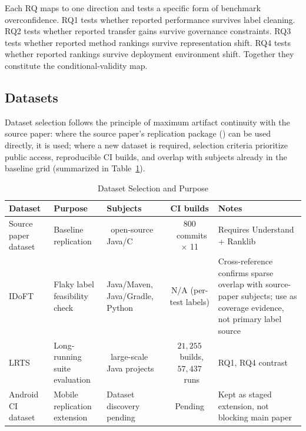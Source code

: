 \documentclass[10pt,conference]{IEEEtran}
\begin{document}
Each RQ maps to one direction and tests a specific form of benchmark overconfidence. RQ1 tests whether reported performance survives label cleaning. RQ2 tests whether reported transfer gains survive governance constraints. RQ3 tests whether reported method rankings survive representation shift. RQ4 tests whether reported rankings survive deployment environment shift. Together they constitute the conditional-validity map.

\subsection{Datasets}

Dataset selection follows the principle of maximum artifact continuity with the source paper: where the source paper's replication package (\cite{sourcepaperreplicationpackage}) can be used directly, it is used; where a new dataset is required, selection criteria prioritize public access, reproducible CI builds, and overlap with subjects already in the baseline grid (summarized in Table~\ref{tab:datasets}).

\begin{table}[htbp]
\centering
\caption{Dataset Selection and Purpose}
\label{tab:datasets}
\begin{tabularx}{\textwidth}{@{} >{\raggedright\arraybackslash}p{} >{\raggedright\arraybackslash}p{} >{\raggedright\arraybackslash}p{} c >{\raggedright\arraybackslash}X @{}}
\toprule
\textbf{Dataset} & \textbf{Purpose} & \textbf{Subjects} & \textbf{CI builds} & \textbf{Notes} \\
\midrule
Source paper dataset~\cite{sourcepaper} & Baseline replication & 11~open-source Java/C & $800$~commits $\times$ 11 & Requires Understand + Ranklib \\
IDoFT~\cite{idoft} & Flaky label feasibility check & Java/Maven, Java/Gradle, Python & N/A (per-test labels) & Cross-reference confirms sparse overlap with source-paper subjects; use as coverage evidence, not primary label source \\
LRTS~\cite{lrts} & Long-running suite evaluation & 10~large-scale Java projects & $21{,}255$~builds, $57{,}437$~runs & RQ1, RQ4 contrast \\
Android CI dataset & Mobile replication extension & Dataset discovery pending & Pending & Kept as staged extension, not blocking main paper \\
\bottomrule
\end{tabularx}
\end{table}
\end{document}
